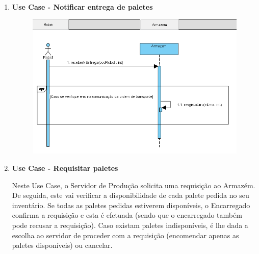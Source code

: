 \documentclass[a4paper]{report}
\begin{document}
\begin{enumerate}
        \item \textbf{Use Case - Notificar entrega de paletes}
            
            \begin{figure}[H]
             \centering
             \includegraphics[scale=0.50]{images/UC-NEntrega.PNG}
             \caption{}
            \end{figure}    
        
        \pagebreak
        \item \textbf{Use Case - Requisitar paletes}
            
            Neste Use Case, o Servidor de Produção solicita uma requisição ao Armazém. De seguida, este vai verificar a disponibilidade de cada palete pedida no seu inventário. Se todas as paletes pedidas estiverem disponíveis, o Encarregado confirma a requisição e esta é efetuada (sendo que o encarregado também pode recusar a requisição). Caso existam paletes indisponíveis, é lhe dada a escolha ao servidor de proceder com a requisição (encomendar apenas as paletes disponíveis) ou cancelar. 
            

\end{enumerate}
\end{document}
